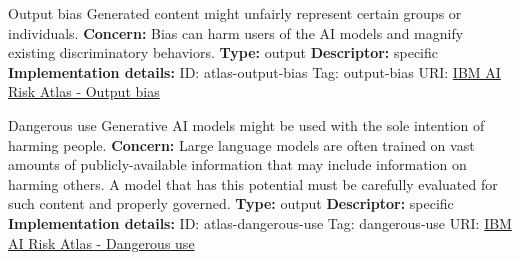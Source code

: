 \documentclass[a4paper,12pt]{article}
\begin{document}
\begin{definitionbox}{Output bias}
Generated content might unfairly represent certain groups or individuals.\newline\newline
\textbf{Concern: }Bias can harm users of the AI models and magnify existing discriminatory behaviors.\newline\newline
\textbf{Type: }output\newline
\textbf{Descriptor: }specific \newline\newline
\textbf{Implementation details: } \newline
ID: atlas-output-bias \newline
Tag: output-bias \newline
URI:  \href{https://www.ibm.com/docs/en/watsonx/saas?topic=SSYOK8/wsj/ai-risk-atlas/output-bias.html}{IBM AI Risk Atlas - Output bias}\newline
\end{definitionbox}
\begin{definitionbox}{Dangerous use}
Generative AI models might be used with the sole intention of harming people.\newline\newline
\textbf{Concern: }Large language models are often trained on vast amounts of publicly-available information that may include information on harming others. A model that has this potential must be carefully evaluated for such content and properly governed.\newline\newline
\textbf{Type: }output\newline
\textbf{Descriptor: }specific \newline\newline
\textbf{Implementation details: } \newline
ID: atlas-dangerous-use \newline
Tag: dangerous-use \newline
URI:  \href{https://www.ibm.com/docs/en/watsonx/saas?topic=SSYOK8/wsj/ai-risk-atlas/dangerous-use.html}{IBM AI Risk Atlas - Dangerous use}\newline
\end{definitionbox}
\end{document}
